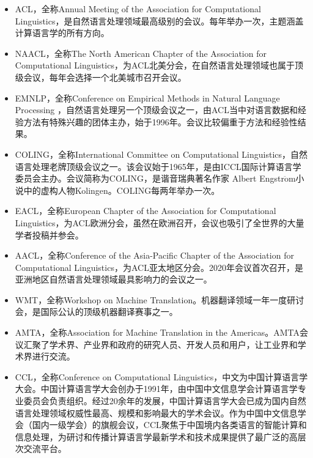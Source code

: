 \begin{itemize}
\vspace{0.5em}
\item ACL，全称Annual Meeting of the Association for Computational Linguistics，是自然语言处理领域最高级别的会议。每年举办一次，主题涵盖计算语言学的所有方向。
\vspace{0.5em}
\item NAACL，全称The North American Chapter of the Association for Computational Linguistics，为ACL北美分会，在自然语言处理领域也属于顶级会议，每年会选择一个北美城市召开会议。
\vspace{0.5em}
\item EMNLP，全称Conference on Empirical Methods in Natural Language Processing ，自然语言处理另一个顶级会议之一，由ACL当中对语言数据和经验方法有特殊兴趣的团体主办，始于1996年。会议比较偏重于方法和经验性结果。
\vspace{0.5em}
\item COLING，全称International Committee on Computational Linguistics，自然语言处理老牌顶级会议之一。该会议始于1965年，是由ICCL国际计算语言学委员会主办。会议简称为COLING，是谐音瑞典著名作家 Albert Engstr$\ddot{\textrm{o}}$m小说中的虚构人物Kolingen。COLING每两年举办一次。
\vspace{0.5em}
\item EACL，全称European Chapter of the Association for Computational Linguistics，为ACL欧洲分会，虽然在欧洲召开，会议也吸引了全世界的大量学者投稿并参会。
\vspace{0.5em}
\item AACL，全称Conference of the Asia-Pacific Chapter of the Association for Computational Linguistics，为ACL亚太地区分会。2020年会议首次召开，是亚洲地区自然语言处理领域最具影响力的会议之一。
\vspace{0.5em}
\item WMT，全称Workshop on Machine Translation。机器翻译领域一年一度研讨会，是国际公认的顶级机器翻译赛事之一。
\vspace{0.5em}
\item AMTA，全称Association for Machine Translation in the Americas。AMTA会议汇聚了学术界、产业界和政府的研究人员、开发人员和用户，让工业界和学术界进行交流。
\vspace{0.5em}
\item CCL，全称Conference on Computational Linguistics，中文为中国计算语言学大会。中国计算语言学大会创办于1991年，由中国中文信息学会计算语言学专业委员会负责组织。经过20余年的发展，中国计算语言学大会已成为国内自然语言处理领域权威性最高、规模和影响最大的学术会议。作为中国中文信息学会（国内一级学会）的旗舰会议，CCL聚焦于中国境内各类语言的智能计算和信息处理，为研讨和传播计算语言学最新学术和技术成果提供了最广泛的高层次交流平台。

\end{itemize}
